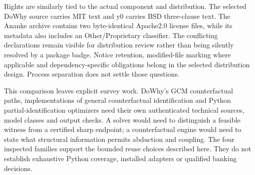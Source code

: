 Rights are similarly tied to the actual component and distribution. The
selected DoWhy source carries MIT text and y0 carries BSD three-clause text.
The Ananke archive contains two byte-identical Apache2.0 license files, while
its metadata also includes an Other/Proprietary classifier. The conflicting
declarations remain visible for distribution review rather than being silently
resolved by a package badge. Notice retention, modified-file marking where
applicable and dependency-specific obligations belong in the selected
distribution design. Process separation does not settle those questions.
\citep{exec13_dowhy_license,exec13_y0_license,exec18_pyid_license,exec18_pyid_metadata}

This comparison leaves explicit survey work. DoWhy's GCM counterfactual paths,
implementations of general counterfactual identification and Python
partial-identification optimizers need their own authenticated technical
sources, model classes and output checks. A solver would need to distinguish
a feasible witness from a certified sharp endpoint; a counterfactual engine
would need to state what structural information permits abduction and coupling.
The four inspected families support the bounded reuse choices described here.
They do not establish exhaustive Python coverage, installed adapters or
qualified banking decisions.\citep{exec18_pyid_contract}
